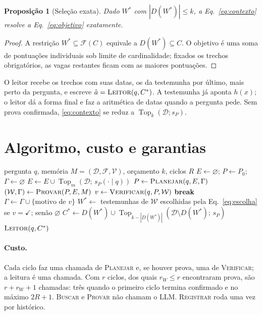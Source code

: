 \documentclass[11pt]{article}
\theoremstyle{definition}
\theoremstyle{plain}
\newtheorem{proposicao}{Proposição}
\newcommand{\op}[1]{\textsc{#1}}
\newcommand{\D}{\mathcal{D}}          %
\newcommand{\F}{\mathcal{F}}          %
\newcommand{\V}{\mathcal{V}}          %
\newcommand{\W}{\mathcal{W}}          %
\newcommand{\Top}{\operatorname{Top}}
\newcommand{\ok}{\checkmark}
\begin{document}
\begin{proposicao}[Seleção exata]
\label{prop:exata}
Dado $W^\ast$ com $|D(W^\ast)|\le k$, a Eq.~\eqref{eq:contexto} resolve a
Eq.~\eqref{eq:objetivo} exatamente.
\end{proposicao}
\begin{proof}
A restrição $W^\ast\subseteq\F(C)$ equivale a $D(W^\ast)\subseteq C$. O
objetivo é uma soma de pontuações individuais sob limite de cardinalidade;
fixados os trechos obrigatórios, as vagas restantes ficam com as maiores
pontuações.
\end{proof}

O leitor recebe os trechos com suas datas, os da testemunha por último, mais
perto da pergunta, e escreve $\hat a=\op{Leitor}(q,C^\ast)$. A testemunha já
aponta $h(x)$; o leitor dá a forma final e faz a aritmética de datas quando a
pergunta pede. Sem prova confirmada, \eqref{eq:contexto} se reduz a
$\Top_k(\D;s_P)$.

\section{Algoritmo, custo e garantias}

\begin{algorithm}[H]
\caption{WitnessRAG para uma pergunta}
\label{alg:witnessrag}
\begin{algorithmic}[1]
\Require pergunta $q$, memória $M=(\D,\F,\V)$, orçamento $k$, ciclos $R$
\State $E\gets\varnothing$;\; $P\gets P_0$;\; $\Gamma\gets\varnothing$
  \State $E\gets E\cup\Top_m(\D;\,s_P(\cdot\mid q))$ 
  \State $P\gets\op{Planejar}(q,E,\Gamma)$ 
  \State $(\W,\Gamma)\gets\op{Provar}(P,E,M)$ 
  \State $v\gets\op{Verificar}(q,P,\W)$ \Comment{sem LLM se $\W=\varnothing$}
  \If{$v=\ok$} \textbf{break} \EndIf
  \State $\Gamma\gets\Gamma\cup\{\text{motivo de } v\}$
\EndFor
\State $W^\ast\gets$ testemunhas de $\W$ escolhidas pela Eq.~\eqref{eq:escolha} se $v=\ok$; senão $\varnothing$
\State $C^\ast\gets D(W^\ast)\cup\Top_{k-|D(W^\ast)|}(\D\setminus D(W^\ast);\,s_P)$ 
\State \Return $\op{Leitor}(q,C^\ast)$
\end{algorithmic}
\end{algorithm}

\paragraph{Custo.} Cada ciclo faz uma chamada de \op{Planejar} e, se houver
prova, uma de \op{Verificar}; a leitura é uma chamada. Com $r$ ciclos, dos
quais $r_W\le r$ encontraram prova, são $r+r_W+1$ chamadas: três quando o
primeiro ciclo termina confirmado e no máximo $2R+1$. \op{Buscar} e
\op{Provar} não chamam o LLM. \op{Registrar} roda uma vez por histórico.
\end{document}
